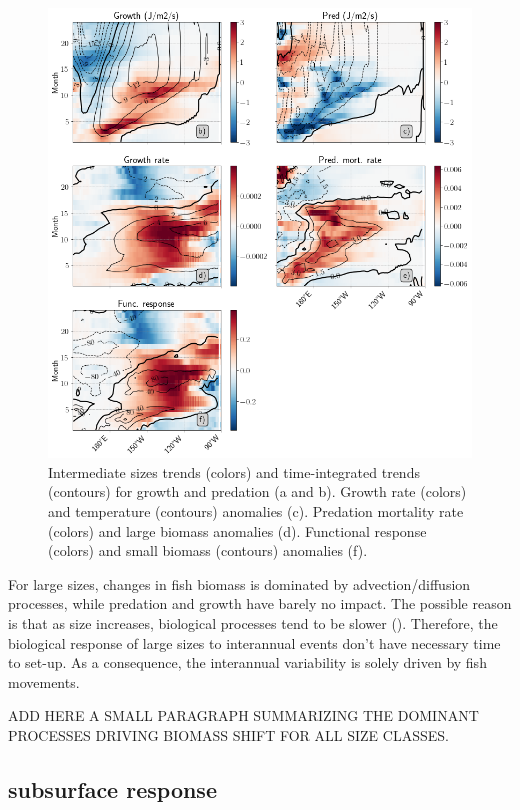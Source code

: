 \begin{figure}[h!tp]
	\centering
	\includegraphics[scale=0.4]{figs/fig9.png}	
	\caption{Intermediate sizes trends (colors) and time-integrated trends (contours) for growth and predation (a and b). Growth rate (colors) and temperature (contours) anomalies (c). Predation mortality rate (colors) and large biomass anomalies (d). Functional response (colors) and small biomass (contours) anomalies (f).}	
	\label{fig:fig9}
\end{figure}

For large sizes, changes in fish biomass is dominated by advection/diffusion processes, while predation and growth have barely no impact. The possible reason is that as size increases, biological processes tend to be slower (). Therefore, the biological response of large sizes to interannual events don't have necessary time to set-up. As a consequence, the interannual variability is solely driven by fish movements.

ADD HERE A SMALL PARAGRAPH SUMMARIZING THE DOMINANT PROCESSES DRIVING BIOMASS SHIFT FOR ALL SIZE CLASSES.

\subsection{subsurface response}


